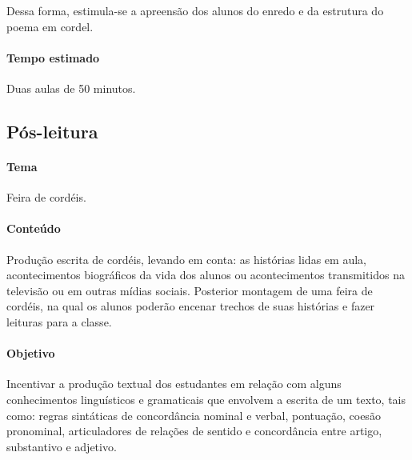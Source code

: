 \documentclass[11pt]{extarticle}
\begin{document}
Dessa forma, estimula-se a apreensão dos alunos do enredo e da estrutura do poema em cordel.

\paragraph{Tempo estimado} Duas aulas de 50 minutos.

\subsection{Pós-leitura}

\paragraph{Tema} Feira de cordéis.








\paragraph{Conteúdo} Produção escrita de cordéis, levando em conta: as histórias lidas em aula, acontecimentos biográficos da vida dos alunos ou acontecimentos transmitidos na televisão ou em outras mídias sociais. Posterior montagem de uma feira de cordéis, na qual os alunos poderão encenar trechos de suas histórias e fazer leituras para a classe.

\paragraph{Objetivo} Incentivar a produção textual dos estudantes em relação com alguns conhecimentos linguísticos e gramaticais que envolvem a escrita de um texto, tais como: regras sintáticas de concordância nominal e verbal, pontuação, coesão pronominal, articuladores de relações de sentido e concordância entre artigo, substantivo e adjetivo.
\end{document}
